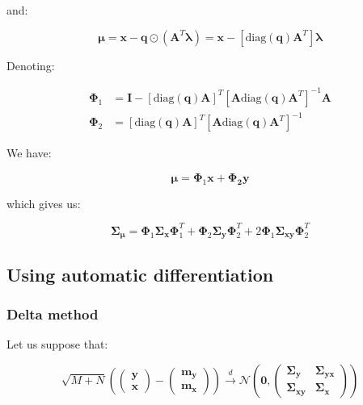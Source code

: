 \documentclass{tex/note}
\begin{document}
and:

\begin{equation*}
\bm{\mu} = \bm{x} - \bm{q} \odot \left( \bm{A}^T \bm{\lambda} \right) = \bm{x} - \left[ \text{diag} \left( \bm{q} \right) \bm{A}^T \right] \bm{\lambda}
\end{equation*}

Denoting:

\begin{align*}
\bm{\Phi}_1 &= \bm{I} - \left[ \text{diag} \left( \bm{q} \right) \bm{A} \right] ^T \left[ \bm{A} \text{diag} \left( \bm{q} \right) \bm{A}^T \right]^{-1} \bm{A} \\
\bm{\Phi}_2 &= \left[ \text{diag} \left( \bm{q} \right) \bm{A} \right] ^T \left[ \bm{A} \text{diag} \left( \bm{q} \right) \bm{A}^T \right]^{-1}
\end{align*}

We have:

\begin{equation*}
\bm{\mu} = \bm{\Phi}_1 \bm{x} + \bm{\Phi_2} \bm{y}
\end{equation*}

which gives us:

\begin{equation*}
\bm{\Sigma}_{\bm{\mu}} = \bm{\Phi}_1 \bm{\Sigma}_{\bm{x}} \bm{\Phi}_1^T  + \bm{\Phi}_2 \bm{\Sigma}_{\bm{y}} \bm{\Phi}_2^T + 2 \bm{\Phi}_1 \bm{\Sigma}_{\bm{x} \bm{y}} \bm{\Phi}_2^T
\end{equation*}

\subsection{Using automatic differentiation}

\subsubsection{Delta method}

Let us suppose that:

\begin{equation*}
\sqrt{M + N} \left( \begin{pmatrix} \bm{y} \\ \bm{x} \end{pmatrix} - \begin{pmatrix} \bm{m}_{\bm{y}} \\ \bm{m}_{\bm{x}} \end{pmatrix} \right) \xrightarrow[]{d} \mathcal{N} \left( \bm{0} , \begin{pmatrix} \bm{\Sigma}_{\bm{y}} & \bm{\Sigma}_{\bm{y} \bm{x}} \\ \bm{\Sigma}_{\bm{x} \bm{y}} & \bm{\Sigma}_{\bm{x}} \end{pmatrix} \right)
\end{equation*}
\end{document}
